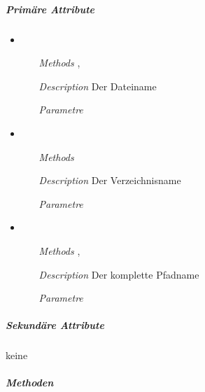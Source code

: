 \subparagraph{Prim\"are Attribute}
\begin{itemize}

\item {}
\begin{enumerate}
\item[\textit{Methods}] ,
\item[\textit{Description}] Der Dateiname
\item[\textit{Parametre}] 
\end{enumerate}

\item {}
\begin{enumerate}
\item[\textit{Methods}] 
\item[\textit{Description}] Der Verzeichnisname
\item[\textit{Parametre}] 
\end{enumerate}

\item {}
\begin{enumerate}
\item[\textit{Methods}] , 
\item[\textit{Description}] Der komplette Pfadname
\item[\textit{Parametre}] 
\end{enumerate}

\end{itemize}


\newpage

\subparagraph{Sekund\"are Attribute}
keine


\newpage

\subparagraph{Methoden}

